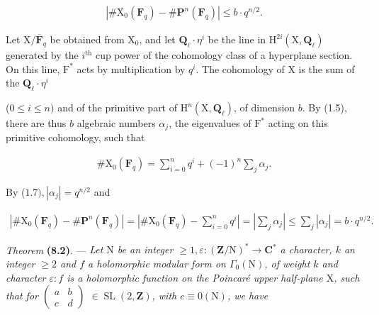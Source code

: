 \documentclass[10pt,leqno]{article}
\begin{document}
\begin{equation*}\begin{gathered}|\# \mathrm{X}_{0}(\mathbf{F}_{q})- \# \mathbf{P}^{n}(\mathbf{F}_{q})| \leq  b\cdot q^{n/2}.\end{gathered}\end{equation*}

\noindent Let \(\mathrm{X}/\overline{\mathbf{F}}_{q}\) be obtained from \(\mathrm{X}_{0}\), and let \(\mathbf{Q}_{\ell }\cdot \eta ^{i}\) be the line in \(\mathrm{H}^{2i}(\mathrm{X},\mathbf{Q}_{\ell })\) generated by the \(i^{\mathrm{th}}\) cup power of the cohomology class of a hyperplane section. On this line, \(\mathrm{F}^{*}\) acts by multiplication by \(q^{i}\). The cohomology of \(\mathrm{X}\) is the sum of the \(\mathbf{Q}_{\ell }\cdot \eta ^{i}\)\par

\clearpage

\label{physical-31}

\noindent (\(0 \leq  i \leq  n)\) and of the primitive part of \(\mathrm{H}^{n}(\mathrm{X}, \mathbf{Q}_{\ell })\), of dimension \(b\). By (1.5), there are thus \(b\) algebraic numbers \(\alpha _{j}\), the eigenvalues of \(\mathrm{F}^{*}\) acting on this primitive cohomology, such that\par

\begin{equation*}\begin{gathered}\# \mathrm{X}_{0}(\mathbf{F}_{q}) = \sum _{i=0}^{n} q^{i} + (-1)^{n} \sum _{j} \alpha _{j}.\end{gathered}\end{equation*}

\noindent By (\(1.7), |\alpha _{j}| = q^{n/2}\) and\par

\begin{equation*}\begin{gathered}|\# \mathrm{X}_{0}(\mathbf{F}_{q}) - \# \mathbf{P}^{n}(\mathbf{F}_{q})| = |\# \mathrm{X}_{0}(\mathbf{F}_{q}) - \sum _{i=0}^{n} q^{i}| = |\sum _{j} \alpha _{j}| \leq  \sum _{j} |\alpha _{j}| = b\cdot q^{n/2}.\end{gathered}\end{equation*}

\noindent \emph{Theorem} \textbf{(8.2)}. — {\itshape Let \(\mathrm{N}\) be an integer \(\geq  1, \varepsilon  : (\mathbf{Z}/\mathrm{N})^{*} \longrightarrow  \mathbf{C}^{*}\) a character, \(k\) an integer \(\geq  2\) and \(f\) a holomorphic modular form on \(\Gamma _{0}(\mathrm{N})\), of weight \(k\) and character \(\varepsilon  : f\) is a holomorphic function on the Poincaré upper half-plane \(\mathrm{X}\), such that for \(\begin{pmatrix}a&b\\c&d\end{pmatrix}\) \(\in  \operatorname{SL}(2, \mathbf{Z})\), with \(c \equiv  0 (\mathrm{N})\), we have}\par
\end{document}

